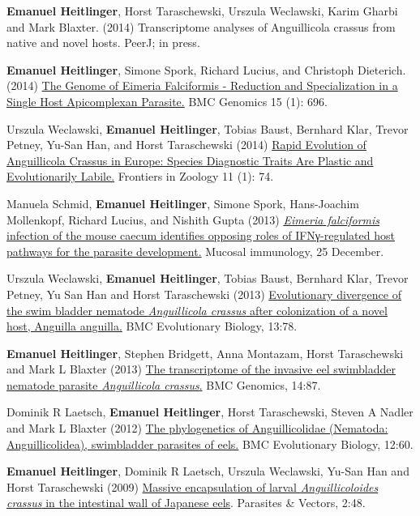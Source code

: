 \documentclass[10pt,a4paper]{article}
\renewenvironment{itemize}{
  \begin{list}{}{
    \setlength{\leftmargin}{2.5em}
    \setlength{\itemsep}{0.25em}
    \setlength{\parskip}{0pt}
    \setlength{\parsep}{0.25em}
  }
}{
  \end{list}
}
\begin{document}
\begin{itemize}


\item \textbf{Emanuel Heitlinger}, Horst Taraschewski, Urszula
  Weclawski, Karim Gharbi and Mark Blaxter. (2014) Transcriptome
  analyses of Anguillicola crassus from native and novel hosts.
  PeerJ; in press.

\item \textbf{Emanuel Heitlinger}, Simone Spork, Richard Lucius, and
  Christoph Dieterich. (2014)
  \href{http://www.biomedcentral.com/1471-2164/15/696/abstract}{The
    Genome of Eimeria Falciformis - Reduction and Specialization in a
    Single Host Apicomplexan Parasite.} BMC Genomics 15 (1): 696.

\item Urszula Weclawski, \textbf{Emanuel Heitlinger}, Tobias Baust,
  Bernhard Klar, Trevor Petney, Yu-San Han, and Horst Taraschewski
  (2014) \href{http://www.frontiersinzoology.com/content/11/1/74}{
    Rapid Evolution of Anguillicola Crassus in Europe: Species
    Diagnostic Traits Are Plastic and Evolutionarily Labile.}
  Frontiers in Zoology 11 (1): 74.

\item Manuela Schmid, \textbf{Emanuel Heitlinger}, Simone Spork, Hans-Joachim
  Mollenkopf, Richard Lucius, and Nishith Gupta (2013)
  \href{http://www.nature.com/mi/journal/vaop/ncurrent/full/mi2013115a.html}
  {\textit{Eimeria falciformis} infection of the mouse caecum identifies
    opposing roles of IFNγ-regulated host pathways for the parasite
    development.} Mucosal immunology, 25 December.

\item Urszula Weclawski, \textbf{Emanuel Heitlinger}, Tobias Baust,
  Bernhard Klar, Trevor Petney, Yu San Han and Horst Taraschewski
  (2013) 
  \href{http://www.biomedcentral.com/1471-2148/13/78}{
    Evolutionary divergence of the swim bladder nematode
    \textit{Anguillicola crassus} after colonization of a novel host,
    Anguilla anguilla.} BMC Evolutionary Biology,
  13:78.

\item \textbf{Emanuel Heitlinger}, Stephen Bridgett, Anna Montazam,
  Horst Taraschewski and Mark L Blaxter (2013)
  \href{http://www.biomedcentral.com/1471-2164/14/87}{The
    transcriptome of the invasive eel swimbladder nematode parasite
    \textit{Anguillicola crassus}.} BMC Genomics, 
  14:87.

\item Dominik R Laetsch, \textbf{Emanuel Heitlinger}, Horst
  Taraschewski, Steven A Nadler and Mark L Blaxter (2012)
  \href{http://www.biomedcentral.com/1471-2148/12/60} {The
    phylogenetics of Anguillicolidae (Nematoda: Anguillicolidea),
    swimbladder parasites of eels.} BMC Evolutionary Biology,
  12:60.

\item \textbf{Emanuel Heitlinger}, Dominik R Laetsch, Urszula
  Weclawski, Yu-San Han and Horst Taraschewski (2009)
  \href{http://www.parasitesandvectors.com/content/2/1/48}{Massive
    encapsulation of larval \textit{Anguillicoloides crassus} in the
    intestinal wall of Japanese eels}. Parasites \& Vectors,
  2:48.
\end{itemize}
\end{document}
